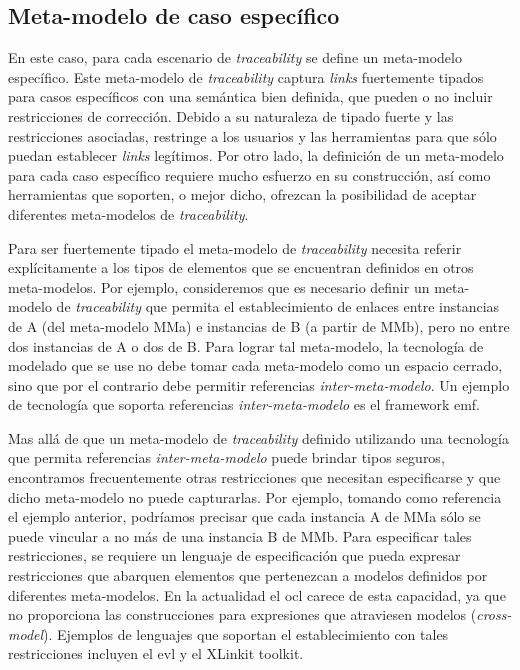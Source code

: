 \documentclass[a4paper,12pt,oneside,spanish]{book}
\begin{document}
\subsection{Meta-modelo de caso específico}

En este caso, para cada escenario de \textit{traceability} se define un meta-modelo específico. Este meta-modelo de \textit{traceability} captura \textit{links} fuertemente tipados para casos específicos con una semántica bien definida, que pueden o no incluir restricciones de corrección. Debido a su naturaleza de tipado fuerte y las restricciones asociadas, restringe a los usuarios y las herramientas para que sólo puedan establecer \textit{links} legítimos. Por otro lado, la definición de un meta-modelo para cada caso específico requiere mucho esfuerzo en su construcción, así como herramientas que soporten, o mejor dicho, ofrezcan la posibilidad de aceptar diferentes meta-modelos de \textit{traceability}.

Para ser fuertemente tipado el meta-modelo de \textit{traceability} necesita referir explícitamente a los tipos de elementos que se encuentran definidos en otros meta-modelos. Por ejemplo, consideremos que es necesario definir un meta-modelo de \textit{traceability} que permita el establecimiento de enlaces entre instancias de A (del meta-modelo MMa) e instancias de B (a partir de MMb), pero no entre dos instancias de A o dos de B. Para lograr tal meta-modelo, la tecnología de modelado que se use no debe tomar cada meta-modelo como un espacio cerrado, sino que por el contrario debe permitir referencias \textit{inter-meta-modelo}. Un ejemplo de tecnología que soporta referencias \textit{inter-meta-modelo} es el framework \gls{emf}.

Mas allá de que un meta-modelo de \textit{traceability} definido utilizando una tecnología que permita referencias \textit{inter-meta-modelo} puede brindar tipos seguros, encontramos frecuentemente otras restricciones que necesitan especificarse y que dicho meta-modelo no puede capturarlas. Por ejemplo, tomando como referencia el ejemplo anterior, podríamos precisar que cada instancia A de MMa sólo se puede vincular a no más de una instancia B de MMb. Para especificar tales restricciones, se requiere un lenguaje de especificación que pueda expresar restricciones que abarquen elementos que pertenezcan a modelos definidos por diferentes meta-modelos. En la actualidad el \gls{ocl} carece de esta capacidad, ya que no proporciona las construcciones para expresiones que atraviesen modelos (\textit{cross-model}). Ejemplos de lenguajes que soportan el establecimiento con tales restricciones incluyen el \gls{evl} y el XLinkit toolkit.
\end{document}
